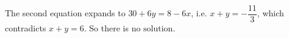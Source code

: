 The second equation expands to $30+6y=8-6x$, i.e. $x+y=-\dfrac{11}3$, which contradicts $x+y=6$. So there is $\boxed{\text{no solution}}$.
